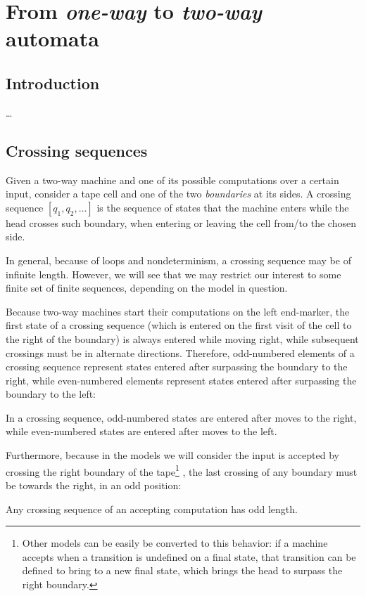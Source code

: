 \chapter{From \emph{one-way} to \emph{two-way} automata}



\section{Introduction}
\dots


\section{Crossing sequences}
Given a two-way machine and one of its possible computations over a certain input, consider a tape cell and one of the two \emph{boundaries} at its sides.
A crossing sequence $[q_1,q_2,\dots]$ is the sequence of states that the machine enters while the head crosses such boundary, \ie when entering or leaving the cell from/to the chosen side.

In general, because of loops and nondeterminism, a crossing sequence may be of infinite length.
However, we will see that we may restrict our interest to some finite set of finite sequences, depending on the model in question.

Because two-way machines start their computations on the left end-marker, the first state of a crossing sequence (which is entered on the first visit of the cell to the right of the boundary) is always entered while moving right, while subsequent crossings must be in alternate directions.
Therefore, odd-numbered elements of a crossing sequence represent states entered after surpassing the boundary to the right, while even-numbered elements represent states entered after surpassing the boundary to the left:
\begin{fact}\label{fact:crossing-parity}
	In a crossing sequence, odd-numbered states are entered after moves to the right, while even-numbered states are entered after moves to the left.
\end{fact}

Furthermore, because in the models we will consider the input is accepted by crossing the right boundary of the tape\footnote{%
	Other models can be easily be converted to this behavior: if a machine accepts when a transition is undefined on a final state, that transition can be defined to bring to a new final state, which brings the head to surpass the right boundary.}%
, the last crossing of any boundary must be towards the right, \ie in an odd position:
\begin{fact}\label{fact:crossing-length}
	Any crossing sequence of an accepting computation has odd length.
\end{fact}


